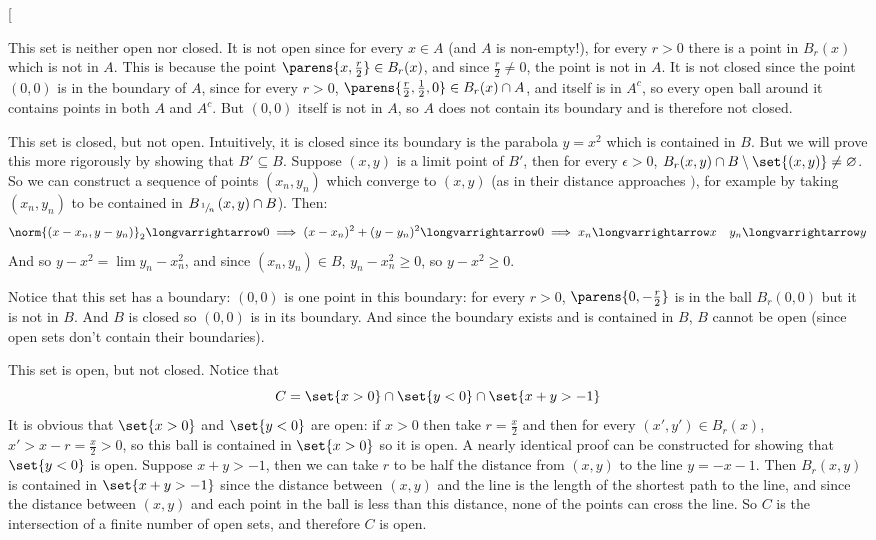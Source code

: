\documentclass[10pt]{article}
\makeatletter
\def\@blist[#1]{%
    \bgroup\bgroup\par\vskip-\medskipamount%
    \gdef\item{%
        \par\egroup\bgroup\medskip\setbox0=\hbox{#1\quad}%
        \advance\leftskip by \wd0\leavevmode\kern-\wd0\box0%
    }%
}
\def\blist{\@ifnextchar[ \@blist {\@blist[$\bullet$]}}
\makeatother
\begin{document}
\begin{blankpp}

    \blist
        \item This set is neither open nor closed.
            It is not open since for every $x\in A$ (and $A$ is non-empty!), for every $r>0$ there is a point in $B_r(x)$ which is not in $A$.
            This is because the point $\parens{x,\frac r2}\in B_r(x)$, and since $\frac r2\neq0$, the point is not in $A$.
            It is not closed since the point $(0,0)$ is in the boundary of $A$, since for every $r>0$, $\parens{\minof{\frac r2, \frac12}, 0}\in B_r(x)\cap A$, and
            itself is in $A^c$, so every open ball around it contains points in both $A$ and $A^c$.
            But $(0,0)$ itself is not in $A$, so $A$ does not contain its boundary and is therefore not closed.
        \item This set is closed, but not open.
            Intuitively, it is closed since its boundary is the parabola $y=x^2$ which is contained in $B$.
            But we will prove this more rigorously by showing that $B'\subseteq B$.
            Suppose $(x,y)$ is a limit point of $B'$, then for every $\epsilon>0$, $B_r(x,y)\cap B\setminus\set{(x,y)}\neq\varnothing$.
            So we can construct a sequence of points $(x_n, y_n)$ which converge to $(x,y)$ (as in their distance approaches $)$,
            for example by taking $(x_n, y_n)$ to be contained in $B_{\slfrac1n}(x,y)\cap B$).
            Then:
            \[ \norm{(x-x_n, y-y_n)}_2 \longvarrightarrow 0 \implies (x-x_n)^2 + (y-y_n)^2\longvarrightarrow0 \implies x_n\longvarrightarrow x\quad y_n\longvarrightarrow y \]
            And so $y-x^2=\lim y_n - x_n^2$, and since $(x_n, y_n)\in B$, $y_n-x_n^2\geq0$, so $y-x^2\geq0$.

            Notice that this set has a boundary: $(0,0)$ is one point in this boundary: for every $r>0$, $\parens{0,-\frac r2}$ is in the ball $B_r(0,0)$ but it is not in $B$.
            And $B$ is closed so $(0,0)$ is in its boundary.
            And since the boundary exists and is contained in $B$, $B$ cannot be open (since open sets don't contain their boundaries).

        \item This set is open, but not closed.
            Notice that
            \[ C = \set{x>0}\cap\set{y<0}\cap\set{x+y>-1} \]
            It is obvious that $\set{x>0}$ and $\set{y<0}$ are open: if $x>0$ then take $r=\frac x2$ and then for every $(x',y')\in B_r(x)$, $x'>x-r=\frac x2>0$, so this ball
            is contained in $\set{x>0}$ so it is open.
            A nearly identical proof can be constructed for showing that $\set{y<0}$ is open.
            Suppose $x+y>-1$, then we can take $r$ to be half the distance from $(x,y)$ to the line $y=-x-1$.
            Then $B_r(x,y)$ is contained in $\set{x+y>-1}$ since the distance between $(x,y)$ and the line is the length of the shortest path to the line, and since the
            distance between $(x,y)$ and each point in the ball is less than this distance, none of the points can cross the line.
            So $C$ is the intersection of a finite number of open sets, and therefore $C$ is open.


\end{blankpp}
\end{document}
